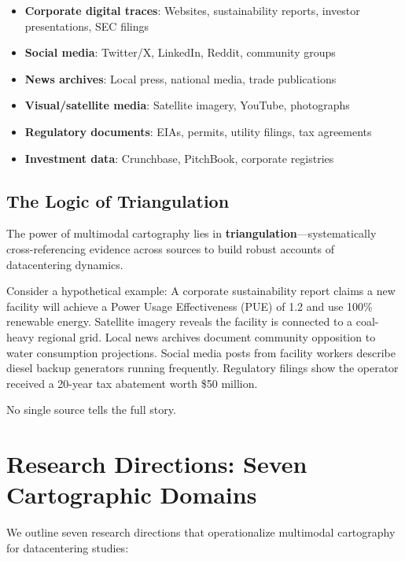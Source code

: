 \documentclass[../../main.tex]{subfiles}
\begin{document}
\begin{itemize}
    \item \textbf{Corporate digital traces}: Websites, sustainability reports, investor presentations, SEC filings
    \item \textbf{Social media}: Twitter/X, LinkedIn, Reddit, community groups
    \item \textbf{News archives}: Local press, national media, trade publications
    \item \textbf{Visual/satellite media}: Satellite imagery, YouTube, photographs
    \item \textbf{Regulatory documents}: EIAs, permits, utility filings, tax agreements
    \item \textbf{Investment data}: Crunchbase, PitchBook, corporate registries
\end{itemize}

\subsection{The Logic of Triangulation}

The power of multimodal cartography lies in \textbf{triangulation}---systematically cross-referencing evidence across sources to build robust accounts of datacentering dynamics.

Consider a hypothetical example: A corporate sustainability report claims a new facility will achieve a Power Usage Effectiveness (PUE) of 1.2 and use 100\% renewable energy. Satellite imagery reveals the facility is connected to a coal-heavy regional grid. Local news archives document community opposition to water consumption projections. Social media posts from facility workers describe diesel backup generators running frequently. Regulatory filings show the operator received a 20-year tax abatement worth \$50 million.

No single source tells the full story.

\section{Research Directions: Seven Cartographic Domains}

We outline seven research directions that operationalize multimodal cartography for datacentering studies:
\end{document}
